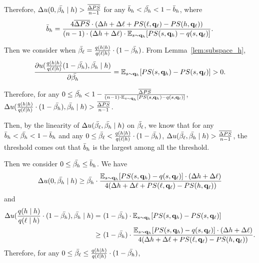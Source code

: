 Therefore, $\Delta u(0, \bar{\beta_{h}} \mid h) > \frac{\overline{\Delta PS}}{ n - 1}$ for any 
$\bar{b}_h <  \bar{\beta_{h}} < 1 - \bar{b}_h$, 
where $$\bar{b}_h = \frac{4\overline{\Delta PS}\cdot (\Delta h + \Delta \ell + PS(\ell, \mathbf{q}_{\ell}) - PS(h, \mathbf{q}_\ell))}{ (n - 1)\cdot (\Delta h +\Delta \ell)\cdot  \mathbb{E}_{s \sim \mathbf{q}_h}[PS(s, \mathbf{q}_h) - q(s, \mathbf{q}_\ell)]}.$$

Then we consider when $\bar{\beta_{\ell}} = \frac{q(h\mid h)}{q(\ell \mid h)} \cdot (1 - \bar{\beta_{h}})$. From Lemma~\ref{lem:subspace_h}, $$\frac{\partial u(\frac{q(h\mid h)}{q(\ell \mid h)}(1 - \bar{\beta_{h}}), \bar{\beta_{h}} \mid h)}{\partial \bar{\beta_{h}}} = \mathbb{E}_{s\sim \mathbf{q}_{h}}[PS(s, \mathbf{q}_{h}) - PS(s, \mathbf{q}_{\ell})] > 0.$$ 

Therefore, for any $0\le \bar{\beta_{h}}< 1 - \frac{\overline{\Delta PS}}{ (n - 1)\cdot \mathbb{E}_{s \sim \mathbf{q}_h}[PS(s, \mathbf{q}_h) - q(s, \mathbf{q}_\ell)]}$,  $\Delta u(\frac{q(h\mid h)}{q(\ell \mid h)} \cdot (1 - \bar{\beta_{h}}), \bar{\beta_{h}} \mid h) > \frac{\overline{\Delta PS}}{ n - 1}$.

Then, by the linearity of $\Delta u (\bar{\beta_{\ell}}, \bar{\beta_{h}} \mid h)$ on $\bar{\beta_{\ell}}$, we know that for any $\bar{b}_h < \bar{\beta_{h}} < 1 - \bar{b}_h$ and any $0\le \bar{\beta_{\ell}} < \frac{q(h\mid h)}{q(\ell \mid h)} \cdot (1 - \bar{\beta_{h}})$, $\Delta u(\bar{\beta_{\ell}}, \bar{\beta_{h}} \mid h) > \frac{\overline{\Delta PS}}{ n - 1}$, the threshold comes out that $\bar{b}_h$ is the largest among all the threshold.  

Then we consider $0\le \bar{\beta_{h}} \le \bar{b}_h$.
We have \begin{equation*}
   \Delta u(0, \bar{\beta_{h}} \mid h)
   \ge \bar{\beta_{h}} \cdot  \frac{\mathbb{E}_{s \sim \mathbf{q}_h}[PS(s, \mathbf{q}_h) - q(s, \mathbf{q}_\ell)]\cdot (\Delta h + \Delta \ell)}{4 (\Delta h + \Delta \ell + PS(\ell, \mathbf{q}_{\ell}) - PS(h, \mathbf{q}_\ell))}
\end{equation*}
and
\begin{align*}
   \Delta u(\frac{q(h\mid h)}{q(\ell \mid h)} \cdot (1 - \bar{\beta_{h}}), \bar{\beta_{h}} \mid h) =&\ ( 1- \bar{\beta_{h}})\cdot \mathbb{E}_{s\sim \mathbf{q}_{h}}[PS(s, \mathbf{q}_{h}) - PS(s, \mathbf{q}_{\ell})]\\
   \ge &\ ( 1- \bar{\beta_{h}})\cdot\frac{\mathbb{E}_{s \sim \mathbf{q}_h}[PS(s, \mathbf{q}_h) - q(s, \mathbf{q}_\ell)]\cdot (\Delta h + \Delta \ell)}{4 (\Delta h + \Delta \ell + PS(\ell, \mathbf{q}_{\ell}) - PS(h, \mathbf{q}_\ell))}.
\end{align*}
Therefore, for any $0\le \bar{\beta_{\ell}} \le \frac{q(h\mid h)}{q(\ell \mid h)} \cdot (1 - \bar{\beta_{h}})$, 

